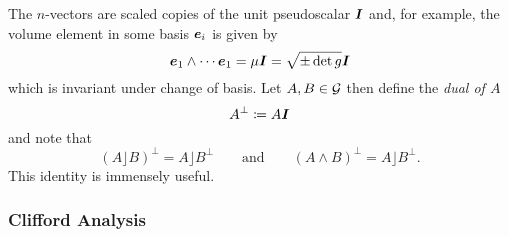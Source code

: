 \documentclass[conf]{new-aiaa}
\begin{document}
The $n$-vectors are scaled copies of the unit pseudoscalar $\boldsymbol{I}$ and, for example, the volume element in some basis $\boldsymbol{e}_i$ is given by
\begin{equation}
    \boldsymbol{e}_1 \wedge \cdots \boldsymbol{e}_1 = \mu \boldsymbol{I} = \sqrt{\pm \det g} \boldsymbol{I}
\end{equation}
which is invariant under change of basis. Let $A, B \in \mathcal{G}$ then define the \emph{dual of $A$}
\begin{equation}
A^\perp \coloneqq A\boldsymbol{I}
\end{equation}
and note that
\begin{equation}
(A\rfloor B)^\perp = A\rfloor B^\perp \qquad \textrm{and}\qquad (A\wedge B)^\perp = A\rfloor B^\perp.
\end{equation}
This identity is immensely useful.


\subsubsection{Clifford Analysis}
\end{document}
